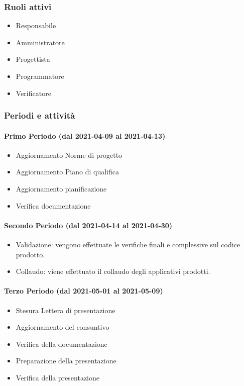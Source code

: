 \subsubsection{Ruoli attivi}
\begin{itemize}
	\item Responsabile
	\item Amministratore
	\item Progettista
	\item Programmatore
	\item Verificatore
\end{itemize}

\subsubsection{Periodi e attività}

\paragraph{Primo Periodo (dal 2021-04-09 al 2021-04-13)}
\begin{itemize}
	\item Aggiornamento Norme di progetto
	\item Aggiornamento Piano di qualifica
	\item Aggiornamento pianificazione
	\item Verifica documentazione
\end{itemize}

\paragraph{Secondo Periodo (dal 2021-04-14 al 2021-04-30)}
\begin{itemize}
	\item Validazione: vengono effettuate le verifiche finali e complessive sul codice prodotto.
	\item Collaudo: viene effettuato il collaudo degli applicativi prodotti.
\end{itemize}

\paragraph{Terzo Periodo (dal 2021-05-01 al 2021-05-09)}
\begin{itemize}
	\item Stesura Lettera di presentazione
	\item Aggiornamento del consuntivo
	\item Verifica della documentazione
	\item Preparazione della presentazione
	\item Verifica della presentazione
\end{itemize}

